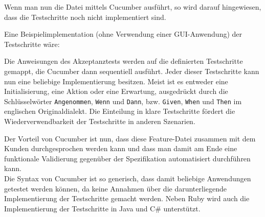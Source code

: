 Wenn man nun die Datei mittels Cucumber ausführt, so wird darauf hingewiesen, dass die Testschritte noch nicht implementiert sind.

Eine Beispielimplementation (ohne Verwendung einer GUI-Anwendung) der Testschritte wäre:
\begin{ruby}[label=features/step\_definitions/steps.rb]
   
     

  
    

  
    

\end{ruby}
Die Anweisungen des Akzeptanztests werden auf die definierten Testschritte gemappt, die Cucumber dann sequentiell ausführt.
Jeder dieser Testschritte kann nun eine beliebige Implementierung besitzen. Meist ist es entweder eine Initialisierung, eine Aktion oder eine Erwartung, ausgedrückt durch die Schlüsselwörter \texttt{Angenommen}, \texttt{Wenn} und \texttt{Dann}, bzw. \texttt{Given}, \texttt{When} und \texttt{Then} im englischen Originaldialekt. Die Einteilung in klare Testschritte fördert die Wiederverwendbarkeit der Testschritte in anderen Szenarien.

Der Vorteil von Cucumber ist nun, dass diese Feature-Datei zusammen mit dem Kunden durchgesprochen werden kann und dass man damit am Ende eine funktionale Validierung gegenüber der Spezifikation automatisiert durchführen kann. \\
Die Syntax von Cucumber ist so generisch, dass damit beliebige Anwendungen getestet werden können, da keine Annahmen über die darunterliegende Implementierung der Testschritte gemacht werden.
Neben Ruby wird auch die Implementierung der Testschritte in Java und C\# unterstützt.

